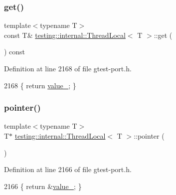 \subsubsection{\texorpdfstring{get()}{get()}}
{\footnotesize\ttfamily template$<$typename T$>$ \\
const T\& \hyperlink{classtesting_1_1internal_1_1ThreadLocal}{testing\+::internal\+::\+Thread\+Local}$<$ T $>$\+::get (\begin{DoxyParamCaption}{ }\end{DoxyParamCaption}) const\hspace{0.3cm}{\ttfamily [inline]}}



Definition at line 2168 of file gtest-\/port.\+h.


\begin{DoxyCode}
2168 \{ \textcolor{keywordflow}{return} \hyperlink{classtesting_1_1internal_1_1ThreadLocal_ae0db6b57bdb752feb343ee4d935708e2}{value\_}; \}
\end{DoxyCode}
\mbox{\label{classtesting_1_1internal_1_1ThreadLocal_a882f57fed4b074de83693c0c0fe62858}} 
\subsubsection{\texorpdfstring{pointer()}{pointer()}\hspace{0.1cm}{\footnotesize\ttfamily [1/2]}}
{\footnotesize\ttfamily template$<$typename T$>$ \\
T$\ast$ \hyperlink{classtesting_1_1internal_1_1ThreadLocal}{testing\+::internal\+::\+Thread\+Local}$<$ T $>$\+::pointer (\begin{DoxyParamCaption}{ }\end{DoxyParamCaption})\hspace{0.3cm}{\ttfamily [inline]}}



Definition at line 2166 of file gtest-\/port.\+h.


\begin{DoxyCode}
2166 \{ \textcolor{keywordflow}{return} &\hyperlink{classtesting_1_1internal_1_1ThreadLocal_ae0db6b57bdb752feb343ee4d935708e2}{value\_}; \}
\end{DoxyCode}
\mbox{\label{classtesting_1_1internal_1_1ThreadLocal_a57e45bb60e3cd94abb04fa449e9f0367}} 
